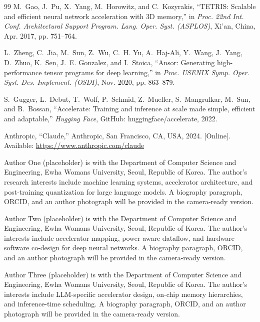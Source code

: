 \documentclass{ieeeaccess}
\begin{document}
\begin{thebibliography}{99}
M.~Gao, J.~Pu, X.~Yang, M.~Horowitz, and C.~Kozyrakis,
``TETRIS: Scalable and efficient neural network acceleration with 3D memory,''
in \emph{Proc. 22nd Int. Conf. Architectural Support Program. Lang. Oper. Syst. (ASPLOS)}, Xi'an, China, Apr. 2017, pp. 751--764.

L.~Zheng, C.~Jia, M.~Sun, Z.~Wu, C.~H. Yu, A.~Haj-Ali, Y.~Wang, J.~Yang, D.~Zhuo, K.~Sen, J.~E. Gonzalez, and I.~Stoica,
``Ansor: Generating high-performance tensor programs for deep learning,''
in \emph{Proc. USENIX Symp. Oper. Syst. Des. Implement. (OSDI)}, Nov. 2020, pp. 863--879.

S.~Gugger, L.~Debut, T.~Wolf, P.~Schmid, Z.~Mueller, S.~Mangrulkar, M.~Sun, and B.~Bossan,
``Accelerate: Training and inference at scale made simple, efficient and adaptable,''
\emph{Hugging Face}, GitHub: huggingface/accelerate, 2022.

Anthropic,
``Claude,'' Anthropic, San Francisco, CA, USA, 2024. [Online].
Available: \url{https://www.anthropic.com/claude}

\end{thebibliography}

\EOD

\begin{IEEEbiography}{Author One} (placeholder) is with the Department
of Computer Science and Engineering, Ewha Womans University, Seoul,
Republic of Korea. The author's research interests include machine
learning systems, accelerator architecture, and post-training
quantization for large language models. A biography paragraph, ORCID,
and an author photograph will be provided in the camera-ready version.
\end{IEEEbiography}

\begin{IEEEbiography}{Author Two} (placeholder) is with the Department
of Computer Science and Engineering, Ewha Womans University, Seoul,
Republic of Korea. The author's interests include accelerator mapping,
power-aware dataflow, and hardware--software co-design for deep neural
networks. A biography paragraph, ORCID, and an author photograph will
be provided in the camera-ready version.
\end{IEEEbiography}

\begin{IEEEbiography}{Author Three} (placeholder) is with the Department
of Computer Science and Engineering, Ewha Womans University, Seoul,
Republic of Korea. The author's interests include LLM-specific
accelerator design, on-chip memory hierarchies, and inference-time
scheduling. A biography paragraph, ORCID, and an author photograph will
be provided in the camera-ready version.
\end{IEEEbiography}
\end{document}
